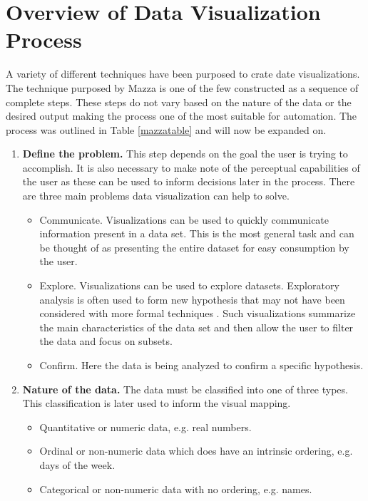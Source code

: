 \documentclass[a4paper, 11pt, titlepage, onehalfspacing]{report}
\begin{document}
\section{Overview of Data Visualization Process}
A variety of different techniques have been purposed to crate date visualizations. The technique purposed by Mazza \cite{mazza2009introduction} is one of the few constructed as a sequence of complete steps. These steps do not vary based on the nature of the data or the desired output making the process one of the most suitable for automation. The process was outlined in Table \ref{mazzatable} and will now be expanded on.
\begin{enumerate}
\label{Mazza_Process}
  \item \textbf{Define the problem.} This step depends on the goal the user is trying to accomplish. It is also necessary to make note of the perceptual capabilities of the user as these can be used to inform decisions later in the process. There are three main problems data visualization can help to solve.

    \begin{itemize}
    \item Communicate. Visualizations can be used to quickly communicate information present in a data set. This is the most general task and can be thought of as presenting the entire dataset for easy consumption by the user.
    \item Explore. Visualizations can be used to explore datasets. Exploratory analysis is often used to form new hypothesis that may not have been considered with more formal techniques \cite{tukey1977exploratory}. Such visualizations summarize the main characteristics of the data set and then  allow the user to filter the data and focus on subsets.
    \item Confirm. Here the data is being analyzed to confirm a specific hypothesis.
  \end{itemize}

  \item \textbf{Nature of the data.} The data must be classified into one of three types. This classification is later used to inform the visual mapping.
  \begin{itemize}
    \item Quantitative or numeric data, e.g. real numbers. 
    \item Ordinal or non-numeric data which does have an intrinsic ordering, e.g. days of the week.
    \item Categorical or non-numeric data with no ordering, e.g. names.
  \end{itemize}


\end{enumerate}
\end{document}
